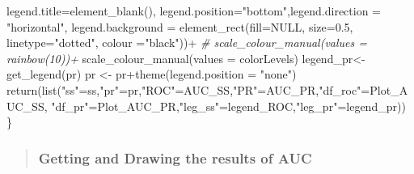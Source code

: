 \documentclass[
]{article}
\newenvironment{Shaded}{\begin{snugshade}}{\end{snugshade}}
\newcommand{\AttributeTok}[1]{\textcolor[rgb]{0.77,0.63,0.00}{#1}}
\newcommand{\CommentTok}[1]{\textcolor[rgb]{0.56,0.35,0.01}{\textit{#1}}}
\newcommand{\ConstantTok}[1]{\textcolor[rgb]{0.00,0.00,0.00}{#1}}
\newcommand{\FloatTok}[1]{\textcolor[rgb]{0.00,0.00,0.81}{#1}}
\newcommand{\FunctionTok}[1]{\textcolor[rgb]{0.00,0.00,0.00}{#1}}
\newcommand{\NormalTok}[1]{#1}
\newcommand{\OtherTok}[1]{\textcolor[rgb]{0.56,0.35,0.01}{#1}}
\newcommand{\SpecialCharTok}[1]{\textcolor[rgb]{0.00,0.00,0.00}{#1}}
\newcommand{\StringTok}[1]{\textcolor[rgb]{0.31,0.60,0.02}{#1}}
\begin{document}
\begin{Shaded}
\begin{Highlighting}[]
        \AttributeTok{legend.title=}\FunctionTok{element\_blank}\NormalTok{(),}
        \AttributeTok{legend.position=}\StringTok{"bottom"}\NormalTok{,}\AttributeTok{legend.direction =} \StringTok{"horizontal"}\NormalTok{,}
\NormalTok{        legend.background}
        \OtherTok{=} \FunctionTok{element\_rect}\NormalTok{(}\AttributeTok{fill=}\ConstantTok{NULL}\NormalTok{, }\AttributeTok{size=}\FloatTok{0.5}\NormalTok{,}
                                         \AttributeTok{linetype=}\StringTok{"dotted"}\NormalTok{, }\AttributeTok{colour =}\StringTok{"black"}\NormalTok{))}\SpecialCharTok{+}
    \CommentTok{\# scale\_colour\_manual(values = rainbow(10))+}
    \FunctionTok{scale\_colour\_manual}\NormalTok{(}\AttributeTok{values =}\NormalTok{  colorLevels)}
\NormalTok{    legend\_pr}\OtherTok{\textless{}{-}} \FunctionTok{get\_legend}\NormalTok{(pr)}
\NormalTok{    pr }\OtherTok{\textless{}{-}}\NormalTok{ pr}\SpecialCharTok{+}\FunctionTok{theme}\NormalTok{(}\AttributeTok{legend.position =} \StringTok{"none"}\NormalTok{)}
    \FunctionTok{return}\NormalTok{(}\FunctionTok{list}\NormalTok{(}\StringTok{"ss"}\OtherTok{=}\NormalTok{ss,}\StringTok{"pr"}\OtherTok{=}\NormalTok{pr,}\StringTok{"ROC"}\OtherTok{=}\NormalTok{AUC\_SS,}\StringTok{"PR"}\OtherTok{=}\NormalTok{AUC\_PR,}\StringTok{"df\_roc"}\OtherTok{=}\NormalTok{Plot\_AUC\_SS,}
                \StringTok{"df\_pr"}\OtherTok{=}\NormalTok{Plot\_AUC\_PR,}\StringTok{"leg\_ss"}\OtherTok{=}\NormalTok{legend\_ROC,}\StringTok{"leg\_pr"}\OtherTok{=}\NormalTok{legend\_pr))}
\NormalTok{\}}
\end{Highlighting}
\end{Shaded}

\begin{quote}
\hypertarget{getting-and-drawing-the-results-of-auc}{%
\subsubsection{Getting and Drawing the results of
AUC}\label{getting-and-drawing-the-results-of-auc}}
\end{quote}
\end{document}
